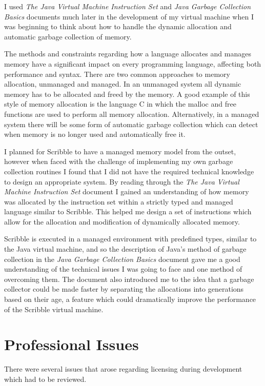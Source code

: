 \documentclass[]{final_report}
\begin{document}
I used \emph{The Java Virtual Machine Instruction Set}\cite{JVMBYTECODE} and \emph{Java Garbage Collection Basics}\cite{JVMGC} documents  much later in the development of my virtual machine when I was beginning to think about how to handle the dynamic allocation and automatic garbage collection of memory. 

The methods and constraints regarding how a language allocates and manages memory have a significant impact on every programming language, affecting both performance and syntax. There are two common approaches to memory allocation, unmanaged and managed. In an unmanaged system all dynamic memory has to be allocated and freed by the memory. A good example of this style of memory allocation is the language C in which the malloc and free functions are used to perform all memory allocation. Alternatively, in a managed system there will be some form of automatic garbage collection which can detect when memory is no longer used and automatically free it. 

I planned for Scribble to have a managed memory model from the outset, however when faced with the challenge of implementing my own garbage collection routines I found that I did not have the required technical knowledge to design an appropriate system. By reading through the \emph{The Java Virtual Machine Instruction Set}\cite{JVMBYTECODE} document I gained an understanding of how memory was allocated by the instruction set within a strictly typed and managed language similar to Scribble. This helped me design a set of instructions which allow for the allocation and modification of dynamically allocated memory.

Scribble is executed in a managed environment with predefined types, similar to the Java virtual machine, and so the description of Java's method of garbage collection in the \emph{Java Garbage Collection Basics}\cite{JVMGC} document gave me a good understanding of the technical issues I was going to face and one method of overcoming them. The document also introduced me to the idea that a garbage collector could be made faster by separating the allocations into generations based on their age, a feature which could dramatically improve the performance of the Scribble virtual machine. 

\chapter{Professional Issues}

There were several issues that arose regarding licensing during development which had to be reviewed.
\end{document}
